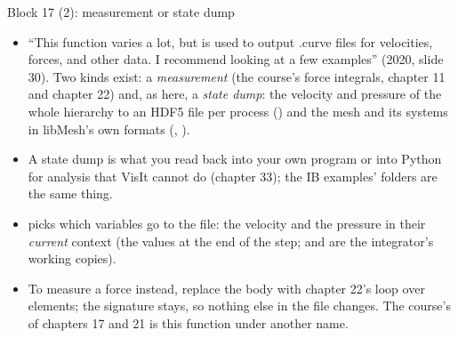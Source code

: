 \documentclass[aspectratio=169,11pt]{beamer}
\begin{document}
\begin{frame}{Block 17 (2): measurement or state dump}
\label{fr:outputdata2}
\footnotesize
\begin{itemize}
  \item ``This function varies a lot, but is used to output .curve files for velocities, forces, and other data. I recommend looking at a few examples'' (2020, slide 30). Two kinds exist: a \emph{measurement} (the course's force integrals, chapter 11 and chapter 22) and, as here, a \emph{state dump}: the velocity and pressure of the whole hierarchy to an HDF5 file per process () and the mesh and its systems in libMesh's own formats (, ).
  \item A state dump is what you read back into your own program or into Python for analysis that VisIt cannot do (chapter 33); the IB examples'  folders are the same thing.
  \item {} picks which variables go to the file: the velocity and the pressure in their \emph{current} context (the values at the end of the step;  and  are the integrator's working copies).
  \item To measure a force instead, replace the body with chapter 22's loop over elements; the signature stays, so nothing else in the file changes. The course's  of chapters 17 and 21 is this function under another name.
\end{itemize}
\end{frame}
\end{document}
